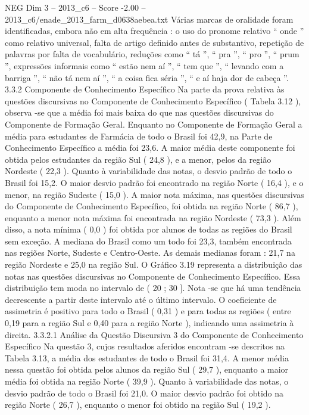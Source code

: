 \begin{textsample}{NEG Dim 3 – 2013\_c6 – Score -2.00 – 2013\_c6/enade\_2013\_farm\_d0638aebea.txt}
Várias marcas de oralidade foram identificadas, embora não em alta frequência : o uso do pronome relativo “ onde ” como relativo universal, falta de artigo definido antes de substantivo, repetição de palavras por falta de vocabulário, reduções como “ tá ”, “ pra ”, “ pro ”, “ prum ”, expressões informais como “ estão nem aí ”, “ tem que ”, “ levando com a barriga ”, “ não tá nem aí ”, “ a coisa fica séria ”, “ e aí haja dor de cabeça ”. 3.3.2 Componente de Conhecimento Específico Na parte da prova relativa às questões discursivas no Componente de Conhecimento Específico ( Tabela 3.12 ), observa -se que a média foi mais baixa do que nas questões discursivas do Componente de Formação Geral.
Enquanto no Componente de Formação Geral a média para estudantes de Farmácia de todo o Brasil foi 42,9, na Parte de Conhecimento Específico a média foi 23,6.
A maior média deste componente foi obtida pelos estudantes da região Sul ( 24,8 ), e a menor, pelos da região Nordeste ( 22,3 ).
Quanto à variabilidade das notas, o desvio padrão de todo o Brasil foi 15,2.
O maior desvio padrão foi encontrado na região Norte ( 16,4 ), e o menor, na região Sudeste ( 15,0 ).
A maior nota máxima, nas questões discursivas do Componente de Conhecimento Específico, foi obtida na região Norte ( 86,7 ), enquanto a menor nota máxima foi encontrada na região Nordeste ( 73,3 ).
Além disso, a nota mínima ( 0,0 ) foi obtida por alunos de todas as regiões do Brasil sem exceção.
A mediana do Brasil como um todo foi 23,3, também encontrada nas regiões Norte, Sudeste e Centro-Oeste.
As demais medianas foram : 21,7 na região Nordeste e 25,0 na região Sul.
O Gráfico 3.19 representa a distribuição das notas nas questões discursivas no Componente de Conhecimento Específico.
Essa distribuição tem moda no intervalo de ( 20 ; 30 ].
Nota -se que há uma tendência decrescente a partir deste intervalo até o último intervalo.
O coeficiente de assimetria é positivo para todo o Brasil ( 0,31 ) e para todas as regiões ( entre 0,19 para a região Sul e 0,40 para a região Norte ), indicando uma assimetria à direita. 3.3.2.1 Análise da Questão Discursiva 3 do Componente de Conhecimento Específico Na questão 3, cujos resultados aferidos encontram -se descritos na Tabela 3.13, a média dos estudantes de todo o Brasil foi 31,4.
A menor média nessa questão foi obtida pelos alunos da região Sul ( 29,7 ), enquanto a maior média foi obtida na região Norte ( 39,9 ).
Quanto à variabilidade das notas, o desvio padrão de todo o Brasil foi 21,0.
O maior desvio padrão foi obtido na região Norte ( 26,7 ), enquanto o menor foi obtido na região Sul ( 19,2 ).

\end{textsample}

